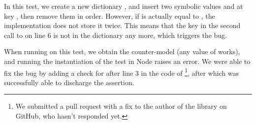 In this test, we create a new dictionary , and insert two symbolic values  and  at key , then remove them in order.
However, if  is actually equal to , the implementation does not store it twice.
This means that the key in the second call to  on line 6 is not in the dictionary any more, which triggers the bug.

When running \cosette on this test, we obtain the counter-model  (any value of  works), and running the instantiation of the test in Node raises an error.
We were able to fix the bug by adding a check for  after line 3 in the code of \footnote{We submitted a pull request with a fix to the author of the library on GitHub, who hasn't responded yet.}, after which \cosette was successfully able to discharge the assertion.


